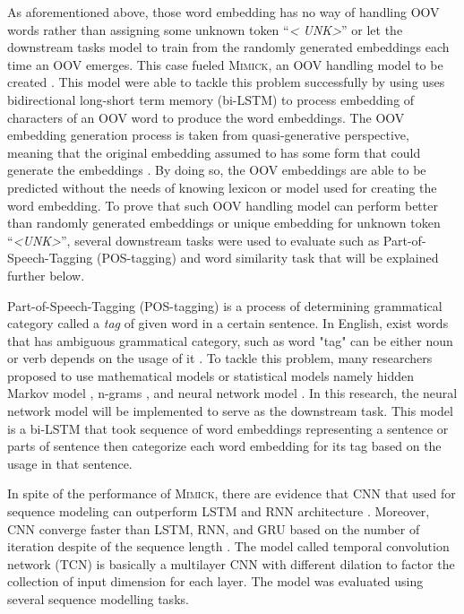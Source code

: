 As aforementioned above, those word embedding has no way of handling
OOV words rather than assigning some unknown token ``\textit{\textless
UNK\textgreater}'' or let the downstream tasks model to train from the
randomly generated embeddings each time an OOV emerges. This case
fueled \textsc{Mimick}, an OOV handling model to be created
\citep{mimicking2017Pinter}. This model were able to tackle this
problem successfully by using uses bidirectional long-short term
memory (bi-LSTM) to process embedding of characters of an OOV word to
produce the word embeddings. The OOV embedding generation process is
taken from quasi-generative perspective, meaning that the original
embedding assumed to has some form that could generate the embeddings
\citep{mimicking2017Pinter}. By doing so, the OOV embeddings are able
to be predicted without the needs of knowing lexicon or model used for
creating the word embedding. To prove that such OOV handling model can
perform better than randomly generated embeddings or unique embedding
for unknown token ``\textit{\textless UNK\textgreater}'', several
downstream tasks were used to evaluate such as Part-of-Speech-Tagging
(POS-tagging) and word similarity task that will be explained further
below.

Part-of-Speech-Tagging (POS-tagging) is a process of determining
grammatical category called a \textit{tag} of given word in a certain
sentence. In English, exist words that has ambiguous grammatical
category, such as word "tag" can be either noun or verb depends on the
usage of it \citep{apractical1992cutting}. To tackle this problem,
many researchers proposed to use mathematical models or statistical
models namely hidden Markov model \citep{apractical1992cutting},
n-grams \citep{tnt2000Brants}, and neural network model
\citep{finding2015ling}. In this research, the neural network model
will be implemented to serve as the downstream task. This model is a
bi-LSTM that took sequence of word embeddings representing a sentence
or parts of sentence then categorize each word embedding for its tag
based on the usage in that sentence.

In spite of the performance of \textsc{Mimick}, there are evidence
that CNN that used for sequence modeling can outperform LSTM and RNN
architecture \citep{empirical2018shaujie}. Moreover, CNN converge
faster than LSTM, RNN, and GRU based on the number of iteration
despite of the sequence length \citep{empirical2018shaujie}. The model
called temporal convolution network (TCN) is basically a multilayer
CNN with different dilation to factor the collection of input
dimension for each layer. The model was evaluated using several
sequence modelling tasks.

